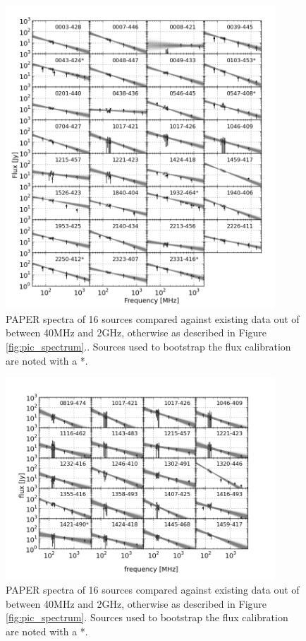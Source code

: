 \documentclass[preprint]{aastex}
\begin{document}
\begin{figure}[htbp]
\begin{center}
\includegraphics[width=0.9\textwidth]{plots/srcfig_1.png}
\end{center}
\caption{PAPER spectra of 16 sources compared against existing data out of  \cite{Vollmer:2010p6422} between 40MHz and 2GHz, otherwise as described in Figure \ref{fig:pic_spectrum}.\label{fig:srcs1}. Sources used to bootstrap the flux calibration are noted with a *.}
\end{figure}

\begin{figure}[htbp]
\begin{center}
\includegraphics[width=0.9\textwidth]{plots/srcfig_2.png}
\caption{PAPER spectra of 16 sources compared against existing data out of  \cite{Vollmer:2010p6422} between 40MHz and 2GHz, otherwise as described in Figure \ref{fig:pic_spectrum}.\label{fig:srcs2} Sources used to bootstrap the flux calibration are noted with a *.}
\end{center}
\end{figure}
\end{document}
